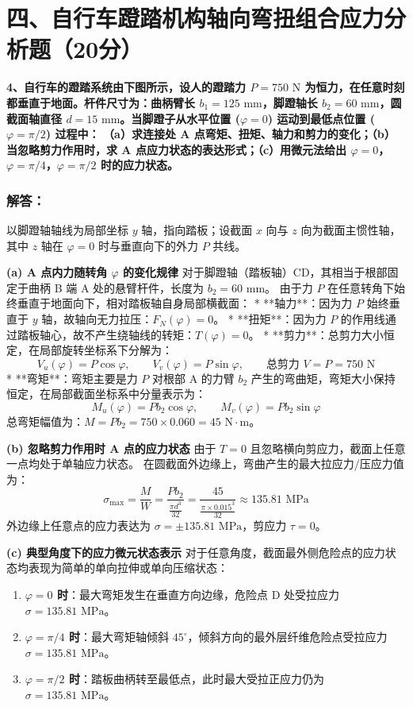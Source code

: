 \documentclass[UTF8,fontset=windows]{ctexart}
\begin{document}
\newpage

\section*{四、自行车蹬踏机构轴向弯扭组合应力分析题（20分）}

\textbf{4、自行车的蹬踏系统由下图所示，设人的蹬踏力 $P=750\text{ N}$ 为恒力，在任意时刻都垂直于地面。杆件尺寸为：曲柄臂长 $b_1 = 125\text{ mm}$，脚蹬轴长 $b_2 = 60\text{ mm}$，圆截面轴直径 $d=15\text{ mm}$。当脚蹬子从水平位置 ($\varphi=0$) 运动到最低点位置 ($\varphi=\pi/2$) 过程中：}
\textbf{（a）求连接处 A 点弯矩、扭矩、轴力和剪力的变化；（b）当忽略剪力作用时，求 A 点应力状态的表达形式；（c）用微元法给出 $\varphi=0$，$\varphi=\pi/4$，$\varphi=\pi/2$ 时的应力状态。}

\subsubsection*{解答：}

以脚蹬轴轴线为局部坐标 $y$ 轴，指向踏板；设截面 $x$ 向与 $z$ 向为截面主惯性轴，其中 $z$ 轴在 $\varphi=0$ 时与垂直向下的外力 $P$ 共线。

\textbf{(a) A 点内力随转角 $\varphi$ 的变化规律}
对于脚蹬轴（踏板轴）CD，其相当于根部固定于曲柄 B 端 A 处的悬臂杆件，长度为 $b_2 = 60\text{ mm}$。
由于力 $P$ 在任意转角下始终垂直于地面向下，相对踏板轴自身局部横截面：
*   **轴力**：因为力 $P$ 始终垂直于 $y$ 轴，故轴向无力拉压：$F_N(\varphi) = 0$。
*   **扭矩**：因为力 $P$ 的作用线通过踏板轴心，故不产生绕轴线的转矩：$T(\varphi) = 0$。
*   **剪力**：总剪力大小恒定，在局部旋转坐标系下分解为：
    \[
        V_u(\varphi) = P \cos\varphi, \qquad V_v(\varphi) = P \sin\varphi, \qquad \text{总剪力 } V = P = 750\text{ N}
    \]
*   **弯矩**：弯矩主要是力 $P$ 对根部 A 的力臂 $b_2$ 产生的弯曲矩，弯矩大小保持恒定，在局部截面坐标系中分量表示为：
    \[
        M_u(\varphi) = P b_2 \cos\varphi, \qquad M_v(\varphi) = P b_2 \sin\varphi
    \]
    总弯矩幅值为：$M = P b_2 = 750 \times 0.060 = 45\text{ N}\cdot\text{m}$。

\textbf{(b) 忽略剪力作用时 A 点的应力状态}
由于 $T = 0$ 且忽略横向剪应力，截面上任意一点均处于单轴应力状态。
在圆截面外边缘上，弯曲产生的最大拉应力/压应力值为：
\[
    \sigma_{\max} = \frac{M}{W} = \frac{P b_2}{\frac{\pi d^3}{32}} = \frac{45}{\frac{\pi \times 0.015^3}{32}} \approx 135.81\text{ MPa}
\]
外边缘上任意点的应力表达为 $\sigma = \pm 135.81\text{ MPa}$，剪应力 $\tau = 0$。

\textbf{(c) 典型角度下的应力微元状态表示}
对于任意角度，截面最外侧危险点的应力状态均表现为简单的单向拉伸或单向压缩状态：
\begin{enumerate}
    \item   \textbf{$\varphi=0$ 时}：最大弯矩发生在垂直方向边缘，危险点 D 处受拉应力 $\sigma = 135.81\text{ MPa}$。
    \item   \textbf{$\varphi=\pi/4$ 时}：最大弯矩轴倾斜 $45^\circ$，倾斜方向的最外层纤维危险点受拉应力 $\sigma = 135.81\text{ MPa}$。
    \item   \textbf{$\varphi=\pi/2$ 时}：踏板曲柄转至最低点，此时最大受拉正应力仍为 $\sigma = 135.81\text{ MPa}$。
\end{enumerate}
\end{document}
